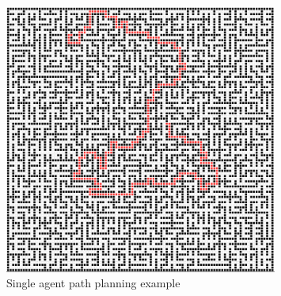 \begin{figure}[H]
    \centering
    \includegraphics[width=0.8\textwidth]{pictures/single_path_maze.png}
    \caption{ Single agent path planning example} 
    \label{fig:single_agent_path}
\end{figure}